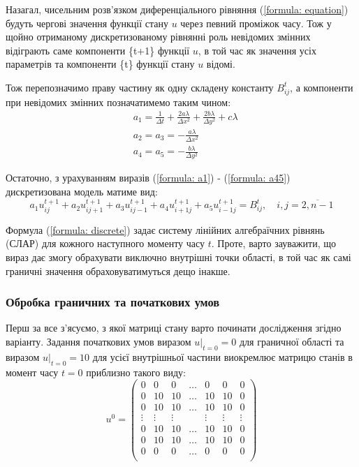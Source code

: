 \documentclass[a4paper,14pt]{extarticle} %
\begin{document}
Назагал, чисельним розв'язком диференціального рівняння (\ref{formula: equation}) будуть чергові значення 
функції стану $u$ через певний проміжок часу. Тож у щойно отриманому дискретизованому рівнянні роль невідомих 
змінних відіграють саме компоненти \{t+1\} функції $u$, в той час як значення усіх параметрів та компоненти 
\{t\} функції стану $u$ відомі.

Тож перепозначимо праву частину як одну складену константу $B_{ij}^t$, а компоненти при невідомих змінних 
позначатимемо таким чином: 
\begin{align}
    &a_1 = \tfrac{1}{\Delta t}+\tfrac{2a\lambda}{\Delta x^2}+\tfrac{2b\lambda}{\Delta y^2}+c\lambda \label{formula: a1} \\
    &a_2 = a_3 = -\tfrac{a\lambda}{\Delta x^2} \label{formula: a23} \\
    &a_4 = a_5 = -\tfrac{b\lambda}{\Delta y^2} \label{formula: a45}
\end{align}

Остаточно, з урахуванням виразів (\ref{formula: a1}) - (\ref{formula: a45}) дискретизована модель матиме вид:
\begin{equation} 
    a_1u_{ij}^{t+1} + a_2u_{ij+1}^{t+1} + a_3u_{ij-1}^{t+1} + a_4u_{i+1j}^{t+1} + a_5u_{i-1j}^{t+1} = B_{ij}^t,\quad i,j=\overline{2,n-1} \label{formula: discrete}
\end{equation}

Формула (\ref{formula: discrete}) задає систему лінійних алгебраїчних рівнянь (СЛАР) для кожного наступного 
моменту часу $t$. Проте, варто зауважити, що вираз дає змогу обрахувати виключно внутрішні точки області, в той 
час як самі граничні значення обраховуватимуться дещо інакше.

\subsubsection*{Обробка граничних та початкових умов}

Перш за все з'ясуємо, з якої матриці стану варто починати дослідження згідно варіанту. Задання початкових умов 
виразом $\left.u\right|_{t=0}=0$ для граничної області та виразом $\left.u\right|_{t=0}=10$ для усієї внутрішньої 
частини виокремлює матрицю станів в момент часу $t=0$ приблизно такого виду: 
\begin{equation}
u^0=
    \begin{pmatrix}
        0 & 0 & 0 & \ldots & 0 & 0 & 0\\
        0 & 10 & 10 & \ldots & 10 & 10 & 0\\
        0 & 10 & 10 & \ldots & 10 & 10 & 0 \\
        \vdots & \vdots & \vdots & & \vdots & \vdots & \vdots \\
        0 & 10 & 10 & \ldots & 10 & 10 & 0 \\
        0 & 10 & 10 & \ldots & 10 & 10 & 0 \\
        0 & 0 & 0 & \ldots & 0 & 0 & 0 \\
    \end{pmatrix} \label{formula: u0}   
\end{equation}
\end{document}
